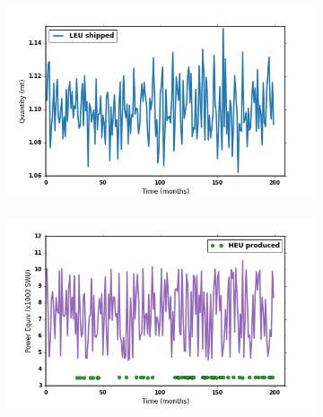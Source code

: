 \begin{figure}%
  \centering
    \begin{subfigure}{0.6\textwidth}
      \includegraphics[natwidth=162bp,natheight=227bp, scale=0.6, clip=true]{./figs/mm_5enrich_tinytails_inspleu_shipped_E5.png}\\[-2ex]
            \label{fig:qty}
            \vspace*{-10mm}
    \end{subfigure}
    \begin{subfigure}{0.6\textwidth}
            \includegraphics[natwidth=162bp,natheight=227bp, scale=0.6]{./figs/mm_5enrich_tinytails_inspEF_power_E5.png}
            \vspace*{-11mm}
            \label{fig:swu}
    \end{subfigure}
    \begin{subfigure}{0.6\textwidth}

\end{subfigure}
\end{figure}
